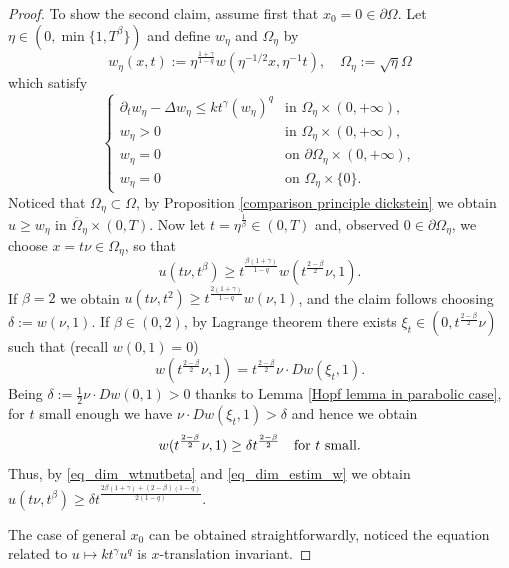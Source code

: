 \documentclass[11pt, reqno]{amsart}
\theoremstyle{definition}
\numberwithin{equation}{section}
\newcommand{\Omegabar}{\overline{\Omega}}
\begin{document}
\begin{proof}
To show the second claim, assume first that $x_0 = 0 \in \partial \Omega$.
Let $\eta \in (0,\min\{1,T^{\beta}\})$ and define $w_\eta$ and $\Omega_\eta$ by 
	\[ w_\eta(x,t) :=\eta^{\frac{1 +\gamma}{1-q}}w(\eta^{-1/2}x,\eta^{-1}t), \quad \Omega_\eta:= \sqrt{\eta} \Omega \]
	which satisfy		
	\begin{equation*}
		\begin{cases}
			\partial_t w_\eta-\Delta w_\eta \leq 
			k t^{\gamma}(w_\eta)^q &\text{in }\Omega_\eta\times (0,+\infty),\\
			w_\eta>0 & \text{in } \Omega_\eta\times (0,+\infty), \\
			w_\eta=0 & \text{on }\partial \Omega_\eta\times (0,+\infty),\\ 
			w_\eta=0& \text{on } \Omega_\eta \times \{0\}.	
			\end{cases}
	\end{equation*}
Noticed that $\Omega_{\eta} \subset \Omega$, by Proposition \ref{comparison principle dickstein} we obtain $u\geq w_\eta$ in $\Omegabar_\eta\times (0,T)$. 
Now let $t=\eta^{\frac{1}{\beta}} \in (0, T)$ and, observed $0 \in \partial \Omega_{\eta}$, we choose $x=t\nu \in \Omega_{\eta}$, so that
\begin{equation}\label{eq_dim_wtnutbeta}
 u(t\nu,t^{\beta})\geq t^{\frac{\beta (1+\gamma)
	}{1-q}}w(t^{\frac{2-\beta}{2}}\nu,1). 
	\end{equation}
	If $\beta=2$ we obtain $u(t\nu,t^{2})\geq t^{\frac{2 (1+\gamma)
	}{1-q}}w(\nu,1)$, and the claim follows choosing $\delta :=w(\nu,1)$. If $\beta \in (0,2)$, 
by Lagrange theorem there exists $\xi_{t}\in (0,t^{\frac{2-\beta}{2}}\nu)$ such that (recall $w(0,1)=0$)
	$$w(t^{\frac{2-\beta}{2}}\nu,1) = t^{\frac{2-\beta}{2}}\nu\cdot D w(\xi_t,1).
	$$
	Being $\delta:= \frac{1}{2}\nu\cdot D w(0,1)>0$ thanks to  Lemma \ref{Hopf lemma in parabolic case}, for $t$ small enough we have $\nu\cdot D w(\xi_t,1)>\delta$ and hence we obtain
	\begin{equation}\label{eq_dim_estim_w}
	 w(t^{\frac{2-\beta}{2}}\nu,1) \geq \delta t^{\frac{2-\beta}{2}}\quad \hbox{for $t$ small}.
	 \end{equation}
	Thus, by \eqref{eq_dim_wtnutbeta} and \eqref{eq_dim_estim_w} we obtain $u(t\nu,t^{\beta})\geq \delta t^{\frac{2\beta(1+\gamma)+(2-\beta)(1-q) }{2(1-q)}}$.

The case of general $x_0$ can be obtained straightforwardly, noticed the equation related to $u \mapsto k t^{\gamma} u^q$ is $x$-translation invariant.
\end{proof}
\end{document}
